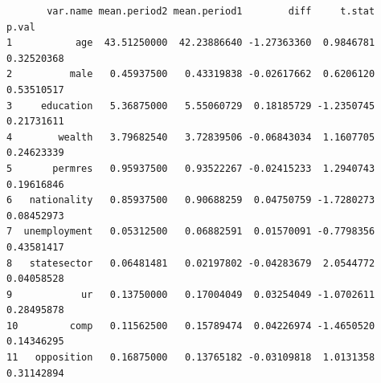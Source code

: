 \documentclass[
  letterpaper,
  DIV=11,
  numbers=noendperiod]{scrartcl}
\newenvironment{Shaded}{\begin{snugshade}}{\end{snugshade}}
\newcommand{\AttributeTok}[1]{\textcolor[rgb]{0.40,0.45,0.13}{#1}}
\newcommand{\ConstantTok}[1]{\textcolor[rgb]{0.56,0.35,0.01}{#1}}
\newcommand{\ControlFlowTok}[1]{\textcolor[rgb]{0.00,0.23,0.31}{\textbf{#1}}}
\newcommand{\DecValTok}[1]{\textcolor[rgb]{0.68,0.00,0.00}{#1}}
\newcommand{\FloatTok}[1]{\textcolor[rgb]{0.68,0.00,0.00}{#1}}
\newcommand{\FunctionTok}[1]{\textcolor[rgb]{0.28,0.35,0.67}{#1}}
\newcommand{\NormalTok}[1]{\textcolor[rgb]{0.00,0.23,0.31}{#1}}
\newcommand{\OtherTok}[1]{\textcolor[rgb]{0.00,0.23,0.31}{#1}}
\newcommand{\SpecialCharTok}[1]{\textcolor[rgb]{0.37,0.37,0.37}{#1}}
\begin{document}
\begin{Shaded}
\end{Shaded}

\begin{verbatim}
       var.name mean.period2 mean.period1        diff     t.stat      p.val
1           age  43.51250000  42.23886640 -1.27363360  0.9846781 0.32520368
2          male   0.45937500   0.43319838 -0.02617662  0.6206120 0.53510517
3     education   5.36875000   5.55060729  0.18185729 -1.2350745 0.21731611
4        wealth   3.79682540   3.72839506 -0.06843034  1.1607705 0.24623339
5       permres   0.95937500   0.93522267 -0.02415233  1.2940743 0.19616846
6   nationality   0.85937500   0.90688259  0.04750759 -1.7280273 0.08452973
7  unemployment   0.05312500   0.06882591  0.01570091 -0.7798356 0.43581417
8   statesector   0.06481481   0.02197802 -0.04283679  2.0544772 0.04058528
9            ur   0.13750000   0.17004049  0.03254049 -1.0702611 0.28495878
10         comp   0.11562500   0.15789474  0.04226974 -1.4650520 0.14346295
11   opposition   0.16875000   0.13765182 -0.03109818  1.0131358 0.31142894
\end{verbatim}
\end{document}

